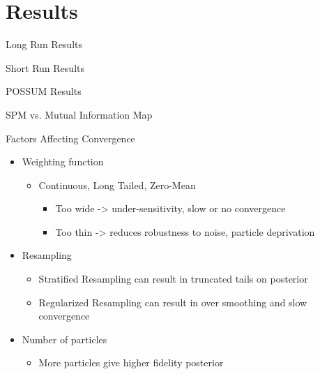 \documentclass{beamer}
\begin{document}
\section{Results}
\begin{frame}{Long Run Results}
\end{frame}

\begin{frame}{Short Run Results}
\end{frame}

\begin{frame}{POSSUM Results}
\end{frame}

\begin{frame}{SPM vs. Mutual Information Map}

\end{frame}

\begin{frame}{Factors Affecting Convergence}
    \begin{itemize}
        \item Weighting function
            \begin{itemize}
                \item Continuous, Long Tailed, Zero-Mean 
                \begin{itemize}
                \item Too wide -> under-sensitivity, slow or no convergence
                \item Too thin -> reduces robustness to noise, particle deprivation
                \end{itemize}
            \end{itemize}
        \item Resampling 
            \begin{itemize}
                \item Stratified Resampling can result in truncated tails 
                        on posterior
                \item Regularized Resampling can result in over smoothing and 
                        slow convergence
            \end{itemize}
        \item Number of particles
            \begin{itemize}
                \item More particles give higher fidelity posterior
            \end{itemize}
    \end{itemize}
\end{frame}
\end{document}
